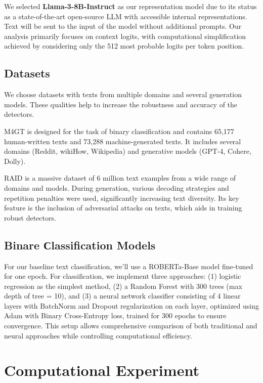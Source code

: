 \documentclass[a4paper, 12pt]{article}
\begin{document}
We selected \textbf{Llama-3-8B-Instruct} as our representation model due to its status as a state-of-the-art open-source LLM with accessible internal representations. Text will be sent to the input of the model without additional prompts. Our analysis primarily focuses on context logits, with computational simplification achieved by considering only the 512 most probable logits per token position.

\subsection{Datasets}

We choose datasets with texts from multiple domains and several generation models. These qualities help to increase the robustness and accuracy of the detectors.

M4GT\citep{wang2024m4gt} is designed for the task of binary classification and contains 65,177 human-written texts and 73,288 machine-generated texts. It includes several domains (Reddit, wikiHow, Wikipedia) and generative models (GPT-4, Cohere, Dolly).

RAID\citep{RAID} is a massive dataset of 6 million text examples from a wide range of domains and models. During generation, various decoding strategies and repetition penalties were used, significantly increasing text diversity. Its key feature is the inclusion of adversarial attacks on texts, which aids in training robust detectors.

\subsection{Binare Сlassification Models}

For our baseline text classification, we'll use a ROBERTa-Base model fine-tuned for one epoch. For classification, we implement three approaches: (1) logistic regression as the simplest method, (2) a Random Forest with 300 trees (max depth of tree = 10), and (3) a neural network classifier consisting of 4 linear layers with BatchNorm and Dropout regularization on each layer, optimized using Adam with Binary Cross-Entropy loss, trained for 300 epochs to ensure convergence. This setup allows comprehensive comparison of both traditional and neural approaches while controlling computational efficiency.

\section{Computational Experiment}
\end{document}
